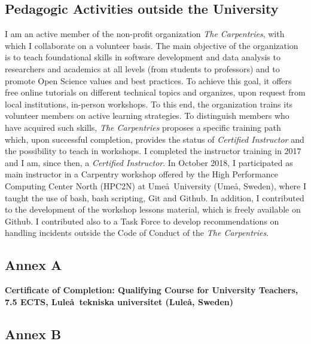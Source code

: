 \documentclass[
  a4paper, 
]{fortysecondscv}
\begin{document}
\subsection{Pedagogic Activities outside the University}
I am an active member of the non-profit organization \emph{The Carpentries}, with which I collaborate on a volunteer basis. The main objective of the organization is to teach foundational skills in software development and data analysis to researchers and academics at all levels (from students to professors) and to promote Open Science values and best practices. To achieve this goal, it offers free online tutorials on different technical topics and organizes, upon request from local institutions, in-person workshops. To this end, the organization trains its volunteer members on active learning strategies. To distinguish members who have acquired such skills, \emph{The Carpentries} proposes a specific training path which, upon successful completion, provides the status of \emph{Certified Instructor} and the possibility to teach in workshops. I completed the instructor training in 2017 and I am, since then, a \emph{Certified Instructor}. In October 2018, I participated as main instructor in a Carpentry workshop offered by the High Performance Computing Center North (HPC2N) at Ume\aa\ University (Ume\aa, Sweden), where I taught the use of bash, bash scripting, Git and Github. In addition, I contributed to the development of the workshop lessons material, which is freely available on Github. I contributed also to a Task Force to develop recommendations on handling incidents outside the Code of Conduct of the \emph{The Carpentries}.

\newpage
\makebacksidebar
\hrulefill\hspace{5pt}\textbf{\thepage}

\subsection{Annex A}

\textbf{Certificate of Completion: Qualifying Course for University Teachers, 7.5 ECTS, Lule\aa\ tekniska universitet (Lule\aa, Sweden)}

\newpage


\newpage
\makebacksidebar
\hrulefill\hspace{5pt}\textbf{\thepage}

\subsection{Annex B}
\end{document}
